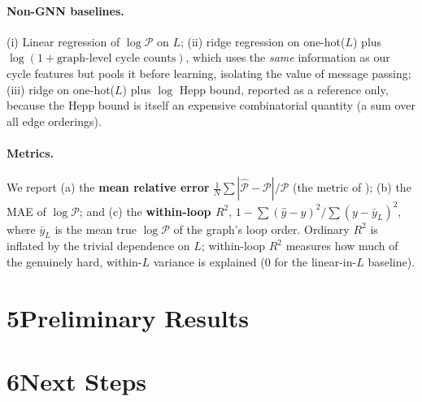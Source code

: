\documentclass[11pt]{article}
\begin{document}
\paragraph{Non-GNN baselines.} (i) Linear regression of $\log\mathcal{P}$ on $L$; (ii) ridge
regression on one-hot($L$) plus $\log(1+\text{graph-level cycle counts})$, which uses the
\emph{same} information as our cycle features but pools it before learning, isolating the value of
message passing; (iii) ridge on one-hot($L$) plus $\log$ Hepp bound, reported as a reference only,
because the Hepp bound is itself an expensive combinatorial quantity (a sum over all edge
orderings).

\paragraph{Metrics.} We report (a) the \textbf{mean relative error} $\frac1N\sum|\hat{\mathcal P}-\mathcal P|/\mathcal P$
(the metric of \citealp{balduf2024predicting}); (b) the MAE of $\log\mathcal{P}$; and (c) the
\textbf{within-loop $R^2$}, $1-\sum(\hat y-y)^2/\sum(y-\bar y_{L})^2$, where $\bar y_L$ is the mean
true $\log\mathcal{P}$ of the graph's loop order. Ordinary $R^2$ is inflated by the trivial
dependence on $L$; within-loop $R^2$ measures how much of the genuinely hard, within-$L$ variance is
explained (0 for the linear-in-$L$ baseline).

\section*{5\quad Preliminary Results}



\section*{6\quad Next Steps}


\end{document}
